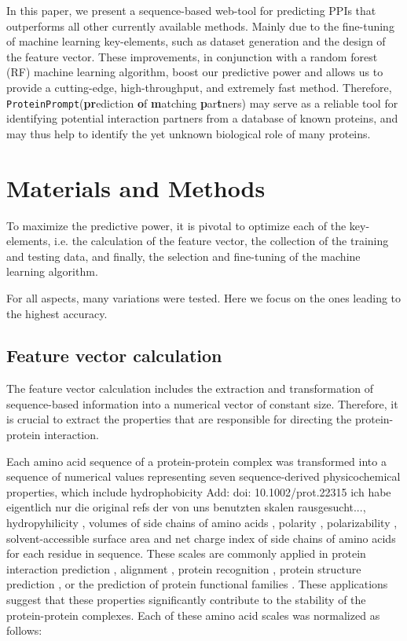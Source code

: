 \documentclass[preprint,3p,times,twocolumn]{elsarticle}
\newcommand{\TODO}[1] {\begingroup\color{red}#1\endgroup}
\newcommand{\SC}[1] {\begingroup\color{purple}#1\endgroup}
\newcommand{\tool}{\texttt{ProteinPrompt}\hspace{2pt}}
\begin{document}
In this paper, we present a sequence-based web-tool for predicting
PPIs that outperforms all other currently available methods. Mainly
due to the fine-tuning of machine learning key-elements, such as
dataset generation and the design of the feature vector. These
improvements, in conjunction with a random forest (RF) machine
learning algorithm, boost our predictive power and allows us to
provide a cutting-edge, high-throughput, and extremely fast
method. Therefore, \tool (\textbf{pr}ediction \textbf{o}f
\textbf{m}atching \textbf{p}ar\textbf{t}ners) may serve as a reliable
tool for identifying potential interaction partners from a database of
known proteins, and may thus help to identify the yet unknown
biological role of many proteins.


\section{Materials and Methods}

To maximize the predictive power, it is pivotal to optimize each of
the key-elements, i.e. the calculation of the feature vector, the
collection of the training and testing data, and finally, the
selection and fine-tuning of the machine learning algorithm. 

For all aspects, many variations were tested. Here we focus on the
ones leading to the highest accuracy. 


\subsection{Feature vector calculation}
The feature vector calculation includes the extraction and
transformation of sequence-based information into a numerical vector
of constant size. Therefore, it is crucial to extract the properties
that are responsible for directing the protein-protein interaction. 

Each amino acid sequence of a protein-protein complex was transformed
into a sequence of numerical values representing seven
sequence-derived physicochemical properties, which include
hydrophobicity \cite{Eisenberg:1984} \TODO{Add: doi:
  10.1002/prot.22315} \SC{ich habe eigentlich nur die original refs
  der von uns benutzten skalen rausgesucht...}, hydropyhilicity
\cite{Hopp:1981}, volumes of side chains of amino acids
\cite{Krigbaum:1979}, polarity \cite{Grantham:1974}, polarizability
\cite{Charton:1982}, solvent-accessible surface area \cite{Rose:1985}
and net charge index of side chains of amino acids \cite{Zhou:2006}
for each residue in sequence. These scales are commonly applied in
protein interaction prediction \cite{Bock:2001} \cite{Bock:2003},
alignment \cite{Stamm:2013}, protein recognition \cite{Ding:2001},
protein structure prediction \cite{Durham:2009}, or the prediction of
protein functional families \cite{Cai:2003}. These applications
suggest that these properties significantly contribute to the
stability of the protein-protein complexes. Each of these amino acid
scales was normalized as follows: 
\end{document}
